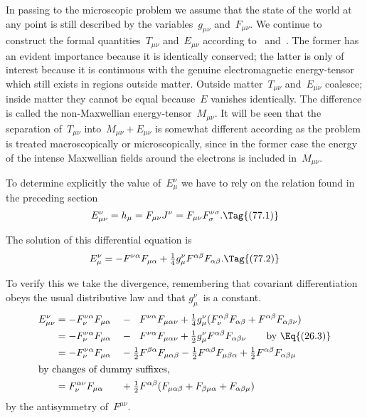 \documentclass[12pt]{book}
\begin{document}
In passing to the microscopic problem we assume that the state of the world at any point is still described by
the variables~$g_{\mu\nu}$ and~$F_{\mu\nu}$.
We continue to construct the formal quantities~$T_{\mu\nu}$ and~$E_{\mu\nu}$ according to~ and~.
The former has an evident importance because it is identically conserved;
the latter is only of interest because it is continuous with the genuine electromagnetic energy-tensor which still
exists in regions outside matter.
Outside matter~$T_{\mu\nu}$ and~$E_{\mu\nu}$ coalesce; inside matter they cannot be equal because~$E$ vanishes
identically.
The difference is called the non-Maxwellian energy-tensor~$M_{\mu\nu}$.
It will be seen that the separation of~$T_{\mu\nu}$ into~$M_{\mu\nu}+E_{\mu\nu}$ is somewhat different according
as the problem is treated macroscopically or microscopically, since in the former case the energy of the intense
Maxwellian fields around the electrons is included in~$M_{\mu\nu}$.

%
%

To determine explicitly the value of~$E_{\mu}^{\nu}$ we have to rely on the relation
found in the preceding section
\[
E_{\mu\nu}^{\nu} = h_{\mu} = F_{\mu\nu} J^{\nu} = F_{\mu\nu} F_{\sigma}^{\nu\sigma}.
\Tag{(77.1)}
\]

The solution of this differential equation is
\[
E_{\mu}^{\nu}  = -F^{\nu\alpha} F_{\mu\alpha} + \tfrac{1}{4} g_{\mu}^{\nu} F^{\alpha\beta} F_{\alpha\beta}.
\Tag{(77.2)}
\]

To verify this we take the divergence, remembering that covariant differentiation
obeys the usual distributive law and that $g_{\mu}^{\nu}$~is a constant.
\begin{alignat*}{2}
  E_{\mu\nu}^{\nu}
  &= -F_{\nu}^{\nu\alpha} F_{\mu\alpha}
  &&- \phantom{\tfrac{1}{2}} F^{\nu\alpha} F_{\mu\alpha\nu}
  + \tfrac{1}{4} g_{\mu}^{\nu}
     (F_{\nu}^{\alpha\beta} F_{\alpha\beta} +  F^{\alpha\beta} F_{\alpha\beta\nu}) \\
%
  &= -F_{\nu}^{\nu\alpha} F_{\mu\alpha}
  &&- \phantom{\tfrac{1}{2}} F^{\nu\alpha} F_{\mu\alpha\nu}
  + \tfrac{1}{2} g_{\mu}^{\nu} F^{\alpha\beta} F_{\alpha\beta\nu}
  \qquad\text{by~\Eq{(26.3)}} \\
%
  &= -F_{\nu}^{\nu\alpha} F_{\mu\alpha}
  &&- \tfrac{1}{2} F^{\beta\alpha} F_{\mu\alpha\beta}
    - \tfrac{1}{2} F^{\alpha\beta} F_{\mu\beta\alpha}
    + \tfrac{1}{2} F^{\alpha\beta} F_{\alpha\beta\mu} \\
\intertext{by changes of dummy suffixes,}
  &= F_{\nu}^{\alpha\nu} F_{\mu\alpha}
  &&+ \tfrac{1}{2} F^{\alpha\beta}(F_{\mu\alpha\beta} + F_{\beta\mu\alpha} + F_{\alpha\beta\mu})
\end{alignat*}
by the antisymmetry of~$F^{\mu\nu}$.
\end{document}
